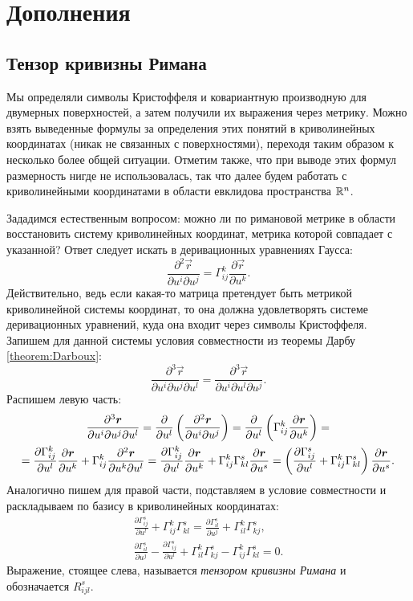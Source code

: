 \section{Дополнения}

\subsection{Тензор кривизны Римана}

Мы определяли символы Кристоффеля и ковариантную производную для двумерных поверхностей, а затем получили их выражения через метрику. Можно взять выведенные формулы за определения этих понятий в криволинейных координатах (никак не связанных с поверхностями), переходя таким образом к несколько более общей ситуации. Отметим также, что при выводе этих формул размерность нигде не использовалась, так что далее будем работать с криволинейными координатами в области евклидова пространства $\mathbb{R}^n$.

Зададимся естественным вопросом: можно ли по римановой метрике в области восстановить систему криволинейных координат, метрика которой совпадает с указанной? Ответ следует искать в деривационных уравнениях Гаусса:
\[
	\frac{\partial^2\vec{r}}{\partial u^i\partial u^j} = \Gamma_{ij}^k\frac{\partial\vec{r}}{\partial u^k}.
\]
Действительно, ведь если какая-то матрица претендует быть метрикой криволинейной системы координат, то она должна удовлетворять системе деривационных уравнений, куда она входит через символы Кристоффеля. Запишем для данной системы условия совместности из теоремы Дарбу \ref{theorem:Darboux}:
\[
	\frac{\partial^3\vec{r}}{\partial u^i\partial u^j\partial u^l} = \frac{\partial^3\vec{r}}{\partial u^i\partial u^l\partial u^j}.
\]
Распишем левую часть:
\begin{multline*}
	\frac{\partial^3\boldsymbol{r}}{\partial u^i\partial u^j\partial u^l} = \frac{\partial}{\partial u^l}\left(\frac{\partial^2\boldsymbol{r}}{\partial u^i\partial u^j}\right) = \frac{\partial}{\partial u^l}\left(\Gamma_{ij}^k\frac{\partial\boldsymbol{r}}{\partial u^k}\right) =\\ = \frac{\partial\Gamma_{ij}^k}{\partial u^l}\frac{\partial\boldsymbol{r}}{\partial u^k} + \Gamma_{ij}^k\frac{\partial^2\boldsymbol{r}}{\partial u^k\partial u^l} = \frac{\partial\Gamma_{ij}^k}{\partial u^l}\frac{\partial\boldsymbol{r}}{\partial u^k} + \Gamma_{ij}^k\Gamma_{kl}^s\frac{\partial\boldsymbol{r}}{\partial u^s} = \left(\frac{\partial\Gamma_{ij}^s}{\partial u^l} + \Gamma_{ij}^k\Gamma_{kl}^s\right)\frac{\partial\boldsymbol{r}}{\partial u^s}.
\end{multline*}
Аналогично пишем для правой части, подставляем в условие совместности и раскладываем по базису в криволинейных координатах:
\begin{gather*}
	\frac{\partial\Gamma_{ij}^s}{\partial u^l} + \Gamma_{ij}^k\Gamma_{kl}^s = \frac{\partial\Gamma_{il}^s}{\partial u^j} + \Gamma_{il}^k\Gamma_{kj}^s,\\
	\frac{\partial\Gamma_{il}^s}{\partial u^j} - \frac{\partial\Gamma_{ij}^s}{\partial u^l} + \Gamma_{il}^k\Gamma_{kj}^s - \Gamma_{ij}^k\Gamma_{kl}^s = 0.
\end{gather*}
Выражение, стоящее слева, называется \textit{тензором кривизны Римана} и обозначается $R^s_{ijl}$.

